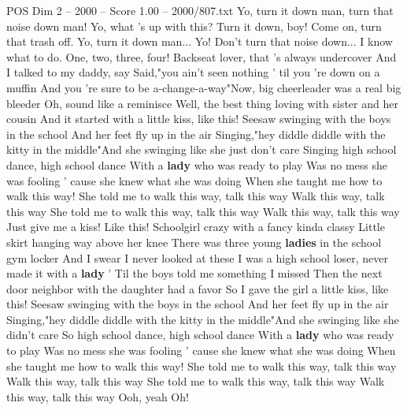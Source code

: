 \begin{textsample}{POS Dim 2 – 2000 – Score 1.00 – 2000/807.txt}  \label{ex:f2_pos_018}
Yo, turn it down man, turn that noise down man!
Yo, what 's up with this?
Turn it down, boy!
Come on, turn that trash off.
Yo, turn it down man...
Yo!
Don't turn that noise down...
I know what to do.
One, two, three, four!
Backseat lover, that 's always undercover And I talked to my daddy, say Said,"you ain't seen nothing ' til you 're down on a muffin And you 're sure to be a-change-a-way"Now, big cheerleader was a real big bleeder Oh, sound like a reminisce Well, the best thing loving with sister and her cousin And it started with a little kiss, like this!
Seesaw swinging with the boys in the school And her feet fly up in the air Singing,"hey diddle diddle with the kitty in the middle"And she swinging like she just don't care Singing high school dance, high school dance With a \textbf{lady} who was ready to play Was no mess she was fooling ' cause she knew what she was doing When she taught me how to walk this way!
She told me to walk this way, talk this way Walk this way, talk this way She told me to walk this way, talk this way Walk this way, talk this way Just give me a kiss!
Like this!
Schoolgirl crazy with a fancy kinda classy Little skirt hanging way above her knee There was three young \textbf{ladies} in the school gym locker And I swear I never looked at these I was a high school loser, never made it with a \textbf{lady} ' Til the boys told me something I missed Then the next door neighbor with the daughter had a favor So I gave the girl a little kiss, like this!
Seesaw swinging with the boys in the school And her feet fly up in the air Singing,"hey diddle diddle with the kitty in the middle"And she swinging like she didn't care So high school dance, high school dance With a \textbf{lady} who was ready to play Was no mess she was fooling ' cause she knew what she was doing When she taught me how to walk this way!
She told me to walk this way, talk this way Walk this way, talk this way She told me to walk this way, talk this way Walk this way, talk this way Ooh, yeah Oh!

\end{textsample}

